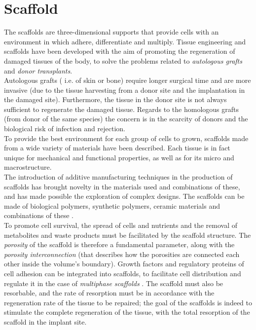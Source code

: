 
\chapter{Scaffold} %

\label{Chapter7} %

 
 

The scaffolds are three-dimensional supports that provide cells with an environment in which adhere, differentiate and multiply. Tissue engineering and scaffolds have been developed with the aim of promoting the regeneration of damaged tissues of the body, to solve the problems related to \emph{autologous grafts} and \emph{donor transplants}. \\ Autologous grafts ( i.e. of skin or bone) require longer surgical time and are more invasive (due to the tissue harvesting from a donor site and the implantation in the damaged site). Furthermore, the tissue in the donor site is not always sufficient to regenerate the damaged tissue. Regards to the homologous grafts (from donor of the same species) the concern is in the scarcity of donors and the biological risk of infection and rejection. \\
To provide the best environment for each group of cells to grown, scaffolds made from a wide variety of materials have been described. Each tissue is in fact unique for mechanical and functional properties, as well as for its micro and macrostructure. \\ The introduction of additive manufacturing techniques in the production of scaffolds has brought novelty in the materials used and combinations of these, and has made possible the exploration of complex designs. The scaffolds can be made of biological polymers, synthetic polymers, ceramic materials and combinations of these \parencites{Reference128}. \\
To promote cell survival, the spread of cells and nutrients and the removal of metabolites and waste products must be facilitated by the scaffold structure. The \emph{porosity} of the scaffold is therefore a fundamental parameter, along with the \emph{porosity interconnection} (that describes how the porosities are connected each other inside the volume's boundary). Growth factors and regulatory proteins of cell adhesion can be integrated into scaffolds, to facilitate cell distribution and regulate it in the case of \emph{multiphase scaffolds} \parencite{Reference129}. The scaffold must also be resorbable, and the rate of resorption must be in accordance with the regeneration rate of the tissue to be repaired; the goal of the scaffolds is indeed to stimulate the complete regeneration of the tissue, with the total resorption of the scaffold in the implant site. \\
